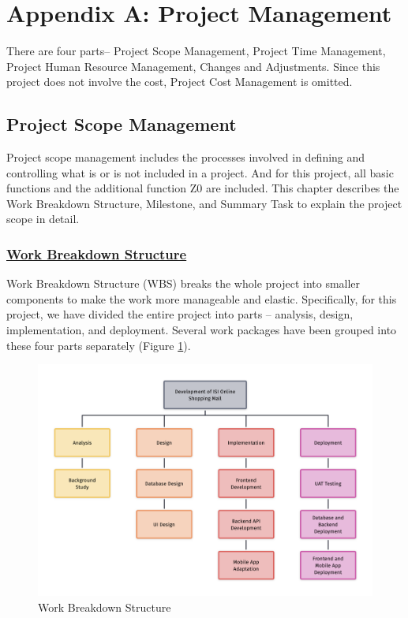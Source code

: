 \documentclass{article}
\begin{document}
\section{Appendix A: Project Management}
There are four parts– Project Scope Management, Project Time Management, Project Human Resource Management, Changes and Adjustments. Since this project does not involve the cost, Project Cost Management is omitted.
\begin{list}{}{\leftmargin=1em}
\item \subsection*{Project Scope Management}
\end{list}
Project scope management includes the processes involved in defining and controlling what is or is not included in a project. And for this project, all basic functions and the additional function Z0 are included. This chapter describes the Work Breakdown Structure, Milestone, and Summary Task to explain the project scope in detail.\\ \subsubsection*{\underline{Work Breakdown Structure}}
Work Breakdown Structure (WBS) breaks the whole project into smaller components to make the work more manageable and elastic. Specifically, for this project, we have divided the entire project into parts -- analysis, design, implementation, and deployment. Several work packages have been grouped into these four parts separately (Figure \ref{fig:Work Breakdown Structure}).
\begin{figure}[!htp]
    \centering
    \includegraphics[width=1\textwidth]{ISI-WBS.png}
    \caption{Work Breakdown Structure}
    \label{fig:Work Breakdown Structure}
\end{figure}
\end{document}
